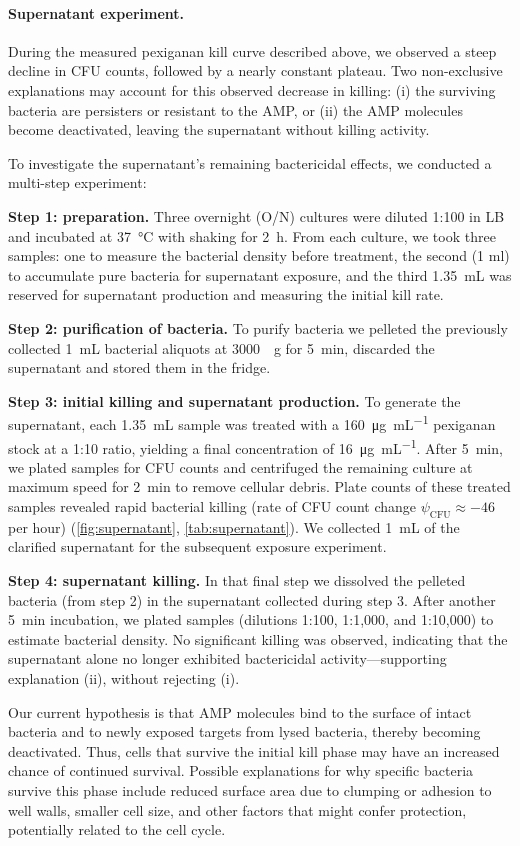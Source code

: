 \paragraph{Supernatant experiment.}
During the measured pexiganan kill curve described above, we observed a steep decline in CFU counts, followed by a nearly constant plateau.
Two non-exclusive explanations may account for this observed decrease in killing:
(i) the surviving bacteria are persisters or resistant to the AMP,
or (ii) the AMP molecules become deactivated, leaving the supernatant without killing activity.

To investigate the supernatant’s remaining bactericidal effects, we conducted a multi-step experiment:

\textbf{Step 1: preparation.}
Three overnight (O/N) cultures were diluted 1:100 in LB and incubated at \SI{37}{\celsius} with shaking for \SI{2}{\hour}.
From each culture, we took three samples: one to measure the bacterial density before treatment, the second (1 ml) to accumulate pure bacteria for supernatant exposure, and the third \SI{1.35}{\milli\liter} was reserved for supernatant production and measuring the initial kill rate.

\textbf{Step 2: purification of bacteria.}
To purify bacteria we pelleted the previously collected \SI{1}{\milli\liter} bacterial aliquots at \SI{3000}{\times g} for \SI{5}{\minute}, discarded the supernatant and stored them in the fridge.

\textbf{Step 3: initial killing and supernatant production.}
To generate the supernatant, each \SI{1.35}{\milli\liter} sample was treated with a \SI{160}{\micro\gram\per\milli\liter} pexiganan stock at a 1:10 ratio, yielding a final concentration of \SI{16}{\micro\gram\per\milli\liter}.
After \SI{5}{\minute}, we plated samples for CFU counts and centrifuged the remaining culture at maximum speed for \SI{2}{\minute} to remove cellular debris. Plate counts of these treated samples revealed rapid bacterial killing (rate of CFU count change $\psi_\mathrm{CFU} \approx -46$ per hour) (\autoref{fig:supernatant}, \autoref{tab:supernatant}).
We collected \SI{1}{\milli\liter} of the clarified supernatant for the subsequent exposure experiment.

\textbf{Step 4: supernatant killing.}
In that final step we dissolved the pelleted bacteria (from step 2) in the supernatant collected during step 3.
After another \SI{5}{\minute} incubation, we plated samples (dilutions 1:100, 1:1{,}000, and 1:10{,}000) to estimate bacterial density.
No significant killing was observed, indicating that the supernatant alone no longer exhibited bactericidal activity—supporting explanation (ii), without rejecting (i).

Our current hypothesis is that AMP molecules bind to the surface of intact bacteria and to newly exposed targets from lysed bacteria, thereby becoming deactivated.
Thus, cells that survive the initial kill phase may have an increased chance of continued survival.
Possible explanations for why specific bacteria survive this phase include reduced surface area due to clumping or adhesion to well walls, smaller cell size, and other factors that might confer protection, potentially related to the cell cycle.
